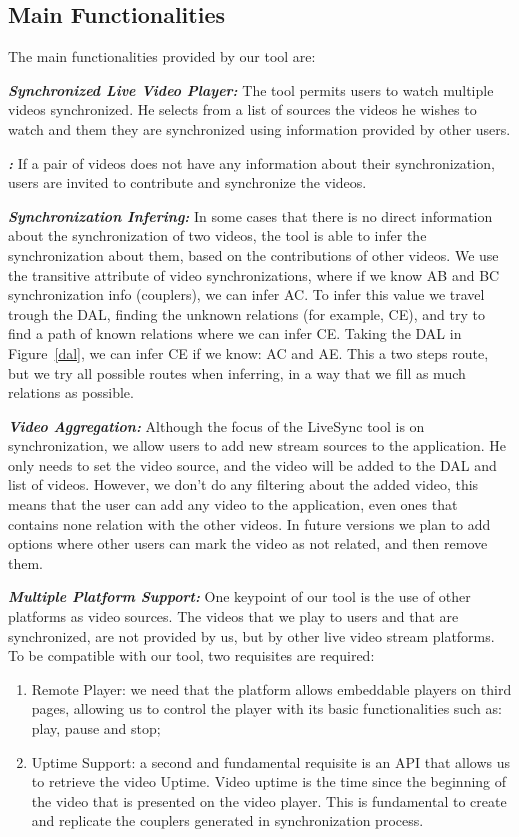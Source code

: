 \documentclass[jidm,a4paper]{jidm} %
\begin{document}
\subsection{Main Functionalities}
	The main functionalities provided by our tool are:

\textbf{\textit{Synchronized Live Video Player:}} The tool permits users to watch multiple videos synchronized. He selects from a list of sources the videos he wishes to watch and them they are synchronized using information provided by other users.

\textbf{\textit{:}} If a pair of videos does not have any information about their synchronization, users are invited to contribute and synchronize the videos.

\textbf{\textit{Synchronization Infering:}}	
	In some cases that there is no direct information about the synchronization of two videos, the tool is able to infer the synchronization about them, based on the contributions of other videos. We use the transitive attribute of video synchronizations, where if we know AB and BC synchronization info (couplers), we can infer AC. To infer this value we travel trough the DAL, finding the unknown relations (for example, CE), and try to find a path of known relations where we can infer CE. Taking the DAL in Figure~\ref{dal}, we can infer CE if we know: AC and AE. This a two steps route, but we try all possible routes when inferring, in a way that we fill as much relations as possible.
	
\textbf{\textit{Video Aggregation:}} Although the focus of the LiveSync tool is on synchronization, we allow users to add new stream sources to the application. He only needs to set the video source, and the video will be added to the DAL and list of videos. However, we don't do any filtering about the added video, this means that the user can add any video to the application, even ones that contains none relation with the other videos. In future versions we plan to add options where other users can mark the video as not related, and then remove them.
	
\textbf{\textit{Multiple Platform Support:}} One keypoint of our tool is the use of other platforms as video sources. The videos that we play to users and that are synchronized, are not provided by us, but by other live video stream platforms. To be compatible with our tool, two requisites are required:
	\begin{enumerate}
		\item Remote Player: we need that the platform allows embeddable players on third pages, allowing us to control the player with its basic functionalities such as: play, pause and stop;
		\item Uptime Support: a second and fundamental requisite is an API that allows us to retrieve the video Uptime. Video uptime is the time since the beginning of the video that is presented on the video player. This is fundamental to create and replicate the couplers generated in synchronization process.
	\end{enumerate}
\end{document}
